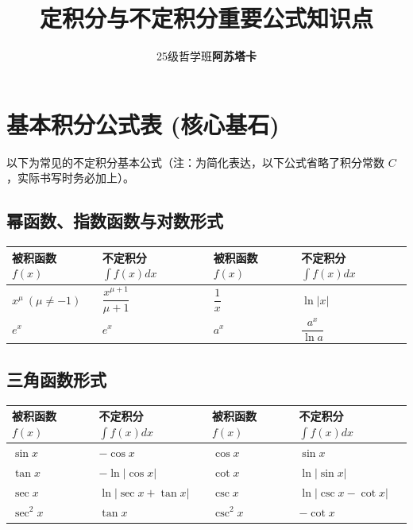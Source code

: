 \documentclass{article}
\title{\textbf{定积分与不定积分重要公式知识点}}
\author{25级哲学班\textbf{阿苏塔卡}}
\date{}
\begin{document}
\maketitle
\thispagestyle{empty} %

\section{基本积分公式表 (核心基石)}
以下为常见的不定积分基本公式（注：为简化表达，以下公式省略了积分常数 $C$，实际书写时务必加上）。

\subsection{幂函数、指数函数与对数形式}
\begin{table}[h]
\centering
\begin{tabular}{ll|ll}
\toprule
\textbf{被积函数 $f(x)$} & \textbf{不定积分 $\int f(x)dx$} & \textbf{被积函数 $f(x)$} & \textbf{不定积分 $\int f(x)dx$} \\
\midrule
$x^\mu \ (\mu \neq -1)$ & $\dfrac{x^{\mu+1}}{\mu+1}$ & $\dfrac{1}{x}$ & $\ln|x|$ \\
$e^x$ & $e^x$ & $a^x$ & $\dfrac{a^x}{\ln a}$ \\
\bottomrule
\end{tabular}
\end{table}

\subsection{三角函数形式}
\begin{table}[h]
\centering
\begin{tabular}{ll|ll}
\toprule
\textbf{被积函数 $f(x)$} & \textbf{不定积分 $\int f(x)dx$} & \textbf{被积函数 $f(x)$} & \textbf{不定积分 $\int f(x)dx$} \\
\midrule
$\sin x$ & $-\cos x$ & $\cos x$ & $\sin x$ \\
$\tan x$ & $-\ln|\cos x|$ & $\cot x$ & $\ln|\sin x|$ \\
$\sec x$ & $\ln|\sec x + \tan x|$ & $\csc x$ & $\ln|\csc x - \cot x|$ \\
$\sec^2 x$ & $\tan x$ & $\csc^2 x$ & $-\cot x$ \\
\bottomrule
\end{tabular}
\end{table}
\end{document}
